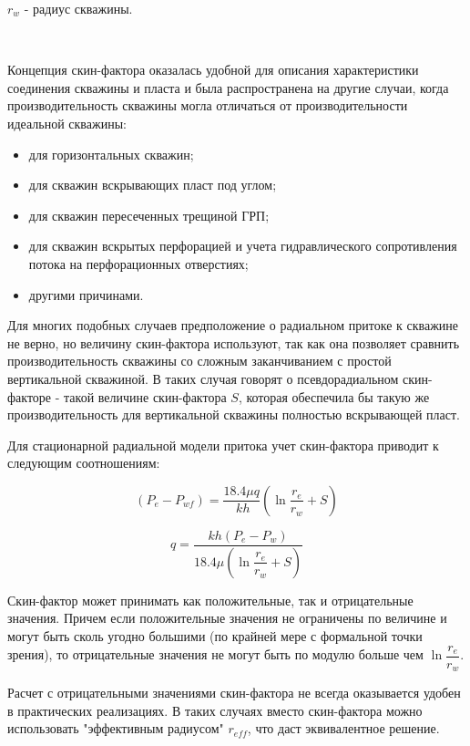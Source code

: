 $r_w$ - радиус скважины.

\

Концепция скин-фактора оказалась удобной для описания характеристики соединения скважины и пласта и была распространена на другие случаи, когда производительность скважины могла отличаться от производительности идеальной скважины:
\begin{itemize}
	\item для горизонтальных скважин;
	\item для скважин вскрывающих пласт под углом;
	\item для скважин пересеченных трещиной ГРП;
	\item для скважин вскрытых перфорацией и учета гидравлического сопротивления потока на перфорационных отверстиях;
	\item другими причинами.
\end{itemize}

Для многих подобных случаев предположение о радиальном притоке к скважине не верно, но величину скин-фактора используют, так как она позволяет сравнить производительность скважины со сложным заканчиванием с простой вертикальной скважиной. В таких случая говорят о псевдорадиальном скин-факторе - такой величине скин-фактора $S$, которая обеспечила бы такую же производительность для вертикальной скважины полностью вскрывающей пласт. 

Для стационарной радиальной модели притока учет скин-фактора приводит к следующим соотношениям:

\begin{equation} \label{eq:dupui_skin_1}
(P_e - P_{wf}) = \frac{18.4\mu q }{\ k h}(\ln\frac{r_e}{r_w}+S) 
\end{equation}


\begin{equation} \label{eq:dupui_skin_2}
q=\frac{kh\left(P_e-P_w\right)}{18.4 \mu\left(\ln{\dfrac{r_e}{r_w}} + S\right)}
\end{equation}

Скин-фактор может принимать как положительные, так и отрицательные значения. Причем если положительные значения не ограничены по величине и могут быть сколь угодно большими (по крайней мере с формальной точки зрения), то отрицательные значения не могут быть по модулю больше чем $\ln{\dfrac{r_e}{r_w}}$.

Расчет с отрицательными значениями скин-фактора не всегда оказывается удобен в практических реализациях. В таких случаях вместо скин-фактора можно использовать "эффективным радиусом" $r_{eff}$, что даст эквивалентное решение. 

